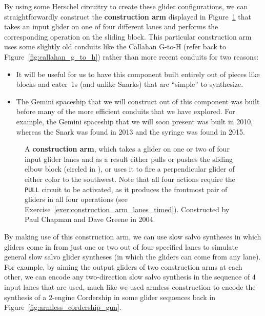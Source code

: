 By using some Herschel circuitry to create these glider configurations, we can straightforwardly construct the \textbf{construction arm} displayed in Figure~\ref{fig:construction_arm} that takes an input glider on one of four different lanes and performs the corresponding operation on the sliding block. This particular construction arm uses some slightly old conduits like the Callahan G-to-H (refer back to Figure~\ref{fig:callahan_g_to_h}) rather than more recent conduits for two reasons:\smallskip

\begin{itemize}
	\item It will be useful for us to have this component built entirely out of pieces like blocks and eater~1s (and unlike Snarks) that are ``simple'' to synthesize.\smallskip
	
	\item The Gemini spaceship that we will construct out of this component was built before many of the more efficient conduits that we have explored. For example, the Gemini spaceship that we will soon present was built in 2010, whereas the Snark was found in 2013 and the syringe was found in 2015.\smallskip
\end{itemize}

\begin{figure}[!htb]
	\centering
	\caption{A \textbf{construction arm}, which takes a glider on one or two of four input glider lanes and as a result either pulls or pushes the sliding elbow block (circled in ), or uses it to fire a perpendicular glider of either color to the southwest. Note that all four actions require the \texttt{PULL} circuit to be activated, as it produces the frontmost pair of gliders in all four operations (see Exercise~\ref{exer:construction_arm_lanes_timed}). Constructed by Paul Chapman and Dave Greene in 2004.}\label{fig:construction_arm}
\end{figure}

By making use of this construction arm, we can use slow salvo syntheses in which gliders come in from just one or two out of four specified lanes to simulate general slow salvo glider syntheses (in which the gliders can come from any lane). For example, by aiming the output gliders of two construction arms at each other, we can encode any two-direction slow salvo synthesis in the sequence of $4$ input lanes that are used, much like we used armless construction to encode the synthesis of a $2$-engine Cordership in some glider sequences back in Figure~\ref{fig:armless_cordership_gun}.

